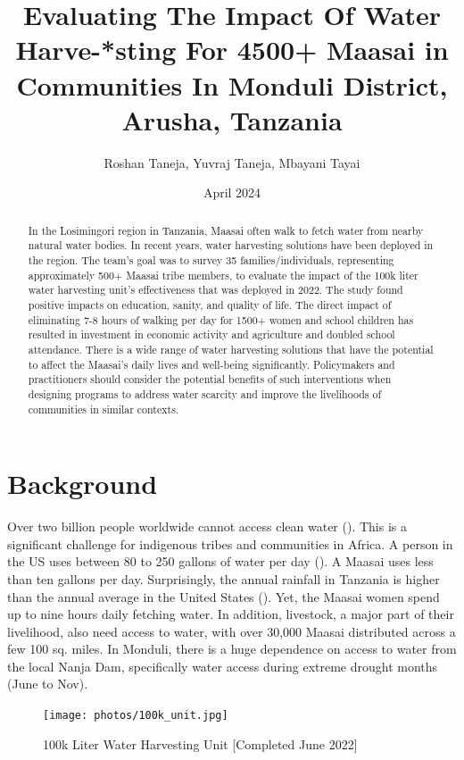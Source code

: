 \documentclass[10pt, twocolumn]{article}
\title{Evaluating The Impact Of Water Harve-*sting For 4500+ Maasai in Communities In Monduli District, Arusha, Tanzania}
\author{Roshan Taneja, Yuvraj Taneja, Mbayani Tayai}
\date{April 2024}
\begin{document}
\maketitle

\begin{abstract}
In the Losimingori region in Tanzania, Maasai often walk to fetch water from nearby natural water bodies. In recent years, water harvesting solutions have been deployed in the region. The team's goal was to survey 35 families/individuals, representing approximately 500+ Maasai tribe members, to evaluate the impact of the 100k liter water harvesting unit's effectiveness that was deployed in 2022. The study found positive impacts on education, sanity, and quality of life. The direct impact of eliminating 7-8 hours of walking per day for 1500+ women and school children has resulted in investment in economic activity and agriculture and doubled school attendance. There is a wide range of water harvesting solutions that have the potential to affect the Maasai's daily lives and well-being significantly. Policymakers and practitioners should consider the potential benefits of such interventions when designing programs to address water scarcity and improve the livelihoods of communities in similar contexts.
\end{abstract}

\section{Background}

Over two billion people worldwide cannot access clean water (\autocite{UNICEF2023}). This is a significant challenge for indigenous tribes and communities in Africa. A person in the US uses between 80 to 250 gallons of water per day (\autocite{EPA}). A Maasai uses less than ten gallons per day. Surprisingly, the annual rainfall in Tanzania is higher than the annual average in the United States (\autocite{Monduli}). Yet, the Maasai women spend up to nine hours daily fetching water. In addition, livestock, a major part of their livelihood, also need access to water, with over 30,000 Maasai distributed across a few 100 sq. miles. In Monduli, there is a huge dependence on access to water from the local Nanja Dam, specifically water access during extreme drought months (June to Nov).

\begin{figure} [H]
    \centering
    \texttt{[image: photos/100k\_unit.jpg]}
    \caption{100k Liter Water Harvesting Unit [Completed June 2022]}
    \label{fig:100k_unit}
\end{figure}
\end{document}
